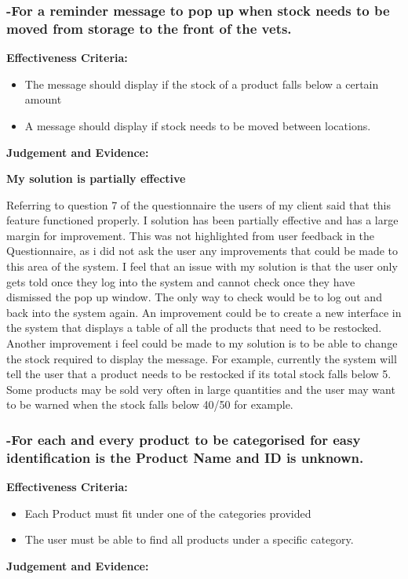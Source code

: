 \pagebreak
\subsubsection{-For a reminder message to pop up when stock needs to be moved from storage to the front of the vets. }

\textbf{Effectiveness Criteria:}\newline
\begin{itemize}
	\item{The message should display if the stock of a product falls below a certain amount}
	\item{A message should display if stock needs to be moved between locations.}
\end{itemize}

\textbf{Judgement and Evidence:} \newline

\textbf{\large{My solution is partially effective}}

Referring to question 7 of the questionnaire the users of my client said that this feature functioned properly. I solution has been partially effective and has a large margin for improvement. This was not highlighted from user feedback in the Questionnaire, as i did not ask the user any improvements that could be made to this area of the system. I feel that an issue with my solution is that the user only gets told once they log into the system and cannot check once they have dismissed the pop up window. The only way to check would be to log out and back into the system again. An improvement could be to create a new interface in the system that displays a table of all the products that need to be restocked. Another improvement i feel could be made to my solution is to be able to change the stock required to display the message. For example, currently the system will tell the user that a product needs to be restocked if its total stock falls below 5. Some products may be sold very often in large quantities and the user may want to be warned when the stock falls below 40/50 for example.




\pagebreak
\subsubsection{-For each and every product to be categorised for easy identification is the Product Name and ID is unknown.}

\textbf{Effectiveness Criteria:}\newline
\begin{itemize}
	\item{Each Product must fit under one of the categories provided}
	\item{The user must be able to find all products under a specific category.}
\end{itemize}
\textbf{Judgement and Evidence:} \newline

